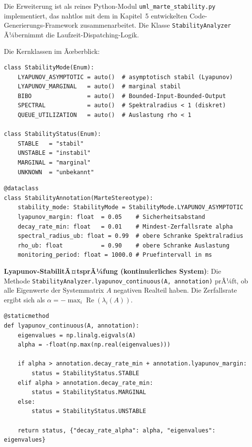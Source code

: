 ﻿\documentclass[a4paper,12pt]{scrreprt}
\theoremstyle{definition}
\begin{document}
Die Erweiterung ist als reines Python-Modul
\texttt{uml\_marte\_stability.py} implementiert, das nahtlos mit dem in
Kapitel~5 entwickelten Code-Generierungs-Framework zusammenarbeitet. Die
Klasse \texttt{StabilityAnalyzer} Ã¼bernimmt die Laufzeit-Dispatching-Logik.

Die Kernklassen im Ãœberblick:
\begin{lstlisting}[style=python,
	caption={Enum-Typen fÃ¼r StabilitÃ¤tsmodi und -status},
	label={lst:stability-enums}]
class StabilityMode(Enum):
	LYAPUNOV_ASYMPTOTIC = auto()  # asymptotisch stabil (Lyapunov)
	LYAPUNOV_MARGINAL   = auto()  # marginal stabil
	BIBO                = auto()  # Bounded-Input-Bounded-Output
	SPECTRAL            = auto()  # Spektralradius < 1 (diskret)
	QUEUE_UTILIZATION   = auto()  # Auslastung rho < 1
	
class StabilityStatus(Enum):
	STABLE   = "stabil"
	UNSTABLE = "instabil"
	MARGINAL = "marginal"
	UNKNOWN  = "unbekannt"
\end{lstlisting}

\begin{lstlisting}[style=python,
	caption={Stereotyp \texttt{<<StabilityAnnotation>>} als Python-Dataclass},
	label={lst:stability-annotation-class}]
@dataclass
class StabilityAnnotation(MarteStereotype):
	stability_mode: StabilityMode = StabilityMode.LYAPUNOV_ASYMPTOTIC
	lyapunov_margin: float  = 0.05    # Sicherheitsabstand
	decay_rate_min: float   = 0.01    # Mindest-Zerfallsrate alpha
	spectral_radius_ub: float = 0.99  # obere Schranke Spektralradius
	rho_ub: float           = 0.90    # obere Schranke Auslastung
	monitoring_period: float = 1000.0 # Pruefintervall in ms
\end{lstlisting}

\textbf{Lyapunov-StabilitÃ¤tsprÃ¼fung (kontinuierliches System)}:
Die Methode \texttt{Stabili\newline tyAnalyzer.lyapunov\_continuous(A, annotation)}
prÃ¼ft, ob alle Eigenwerte der Systemmatrix $A$ negativen Realteil haben.
Die Zerfallsrate ergibt sich als
$\alpha = -\max_i \operatorname{Re}(\lambda_i(A))$.

\begin{lstlisting}[style=python,
	caption={Lyapunov-StabilitÃ¤tsprÃ¼fung via Eigenwertanalyse},
	label={lst:lyapunov}]
@staticmethod
def lyapunov_continuous(A, annotation):
	eigenvalues = np.linalg.eigvals(A)
	alpha = -float(np.max(np.real(eigenvalues)))
	
	if alpha > annotation.decay_rate_min + annotation.lyapunov_margin:
		status = StabilityStatus.STABLE
	elif alpha > annotation.decay_rate_min:
		status = StabilityStatus.MARGINAL
	else:
		status = StabilityStatus.UNSTABLE
	
	return status, {"decay_rate_alpha": alpha, "eigenvalues": eigenvalues}
\end{lstlisting}
\end{document}
